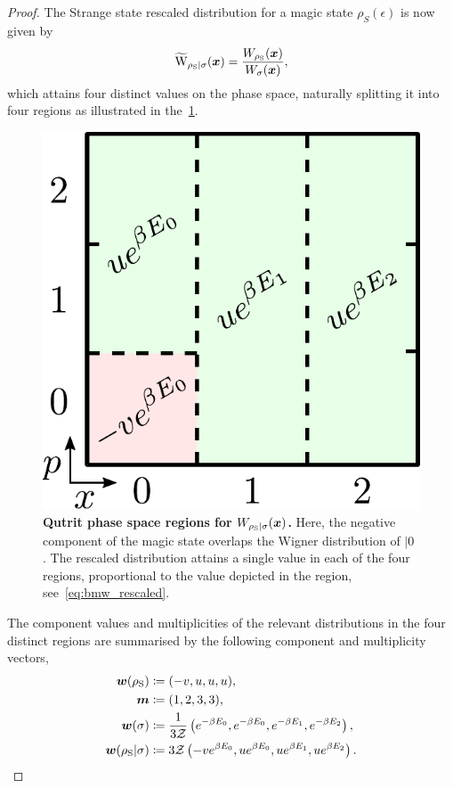 \documentclass[pra,
aps,
twocolumn,
superscriptaddress,
groupedaddress,
nofootinbib,
reprint
]{revtex4-1}
\begin{document}
\begin{proof}
The Strange state rescaled distribution for a magic state $\rho_S(\epsilon)$ is now given by 
\begin{equation}
	\widetilde{\rm{W}}_{\rho_{\rm{S}}|\sigma}(\bmx) = \frac{\W[\bmx]{\rho_{\rm{S}}}}{\W[\bmx]{\sigma}},
\end{equation}
which attains four distinct values on the phase space, naturally splitting it into four regions as illustrated in the~\cref{fig:pd_split}.
\begin{figure}[h]
    \centering
    \includegraphics[scale=0.45]{figs/pd_split_thermal.pdf}
    \caption{\textbf{Qutrit phase space regions for $W_{\rho_{\rm{S}} | \sigma}(\boldsymbol{x})$.}
    Here, the negative component of the magic state overlaps the Wigner distribution of $|0\>$. The rescaled distribution attains a single value in each of the four regions, proportional to the value depicted in the region, see~\cref{eq:bmw_rescaled}.
    }
    \label{fig:pd_split}
\end{figure}

The component values and multiplicities of the relevant distributions in the four distinct regions are summarised by the following component and multiplicity vectors,
\begin{align}
	\bm{w}(\rho_{\rm{S}}) &\coloneqq (-v, u, u, u), \\
		\bm{m} &\coloneqq (1,2,3,3), \\
	\bm{w}(\sigma) &\coloneqq \frac{1}{3\mathcal{Z}} \left( e^{-\beta E_0}, e^{-\beta E_0}, e^{-\beta E_1}, e^{-\beta E_2} \right), \\
	\bm{w}(\rho_{\rm{S}} | \sigma) &\coloneqq 3\mathcal{Z} \left( -v e^{\beta E_0}, u e^{\beta E_0}, u e^{\beta E_1}, u e^{\beta E_2} \right). \label{eq:bmw_rescaled}
\end{align}


\end{proof}
\end{document}
